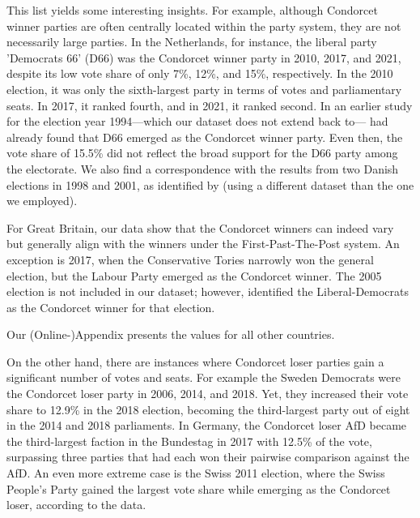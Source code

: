 \documentclass[12pt]{scrartcl}
\begin{document}


This list yields some interesting insights. For example, although Condorcet winner parties are often centrally located within the party system, they are not necessarily large parties. In the Netherlands, for instance, the liberal party 'Democrats 66' (D66) was the Condorcet winner party in 2010, 2017, and 2021, despite its low vote share of only 7\%, 12\%, and 15\%, respectively. In the 2010 election, it was only the sixth-largest party in terms of votes and parliamentary seats. In 2017, it ranked fourth, and in 2021, it ranked second. In an earlier study for the election year 1994---which our dataset does not extend back to---\cite{vanDeemen1998} had already found that D66 emerged as the Condorcet winner party. Even then, the vote share of 15.5\% did not reflect the broad support for the D66 party among the electorate. We also find a correspondence with the results from two Danish elections in 1998 and 2001, as identified by \cite{KurrildKlitgaard2008} (using a different dataset than the one we employed). 

For Great Britain, our data show that the Condorcet winners can indeed vary but generally align with the winners under the First-Past-The-Post system. An exception is 2017, when the Conservative Tories narrowly won the general election, but the Labour Party emerged as the Condorcet winner. The 2005 election is not included in our dataset; however, \cite{Abramson2013} identified the Liberal-Democrats as the Condorcet winner for that election.

Our (Online-)Appendix presents the values for all other countries.

On the other hand, there are instances where Condorcet loser parties gain a significant number of votes and seats. For example the Sweden Democrats were the Condorcet loser party in 2006, 2014, and 2018. Yet, they increased their vote share to 12.9\% in the 2018 election, becoming the third-largest party out of eight in the 2014 and 2018 parliaments. In Germany, the Condorcet loser AfD became the third-largest faction in the Bundestag in 2017 with 12.5\% of the vote, surpassing three parties that had each won their pairwise comparison against the AfD. An even more extreme case is the Swiss 2011 election, where the Swiss People's Party gained the largest vote share while emerging as the Condorcet loser, according to the data.
\end{document}
